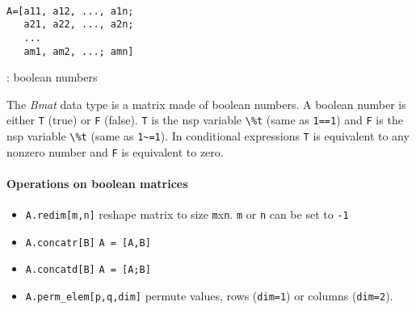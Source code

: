 
\begin{mandesc}
   \\
\end{mandesc}
\begin{calling_sequence}
\begin{verbatim}
A=[a11, a12, ..., a1n;
   a21, a22, ..., a2n;
   ...
   am1, am2, ...; amn]
\end{verbatim}
\end{calling_sequence}
\begin{parameters}
  \begin{varlist}
    : boolean numbers
  \end{varlist}
\end{parameters}

\begin{mandescription}
The \emph{Bmat} data type is a matrix made of boolean numbers. 
A boolean number is either \verb+T+ (true) or \verb+F+ (false). 
\verb+T+ is the nsp variable \verb+\%t+ (same as \verb+1==1+)
and \verb+F+ is the nsp variable \verb+\%t+ (same as \verb+1~=1+).
In conditional expressions \verb+T+ is equivalent to any nonzero
number and \verb+F+ is equivalent to zero.
\end{mandescription}

\paragraph{Operations on boolean matrices}
\begin{itemize}
\item \verb+A.redim[m,n]+ reshape matrix to size \verb+m+x\verb+n+. \verb+m+ or \verb+n+ can be set to \verb+-1+ 
\item \verb+A.concatr[B]+ \verb+A = [A,B]+
\item \verb+A.concatd[B]+ \verb+A = [A;B]+
\item \verb+A.perm_elem[p,q,dim]+ permute values, rows (\verb+dim=1+) or columns (\verb+dim=2+).
\end{itemize}

